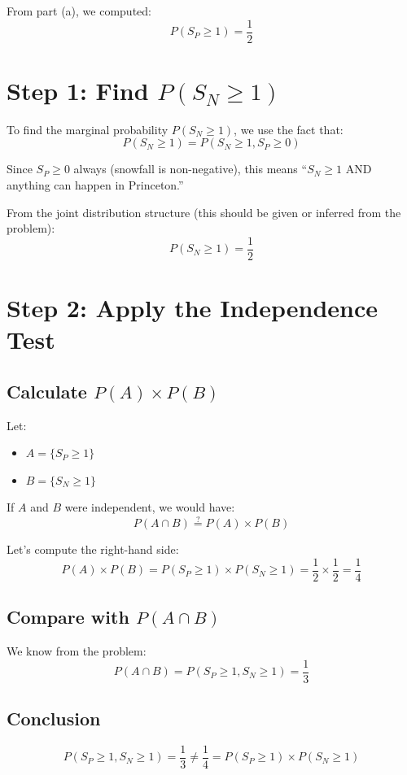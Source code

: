 \documentclass[11pt]{article}
\begin{document}
From part (a), we computed:
\[
P(S_P \geq 1) = \frac{1}{2}
\]

\section*{Step 1: Find $P(S_N \geq 1)$}

To find the marginal probability $P(S_N \geq 1)$, we use the fact that:
\[
P(S_N \geq 1) = P(S_N \geq 1, S_P \geq 0)
\]

Since $S_P \geq 0$ always (snowfall is non-negative), this means ``$S_N \geq 1$ AND anything can happen in Princeton.''

From the joint distribution structure (this should be given or inferred from the problem):
\[
P(S_N \geq 1) = \frac{1}{2}
\]

\section*{Step 2: Apply the Independence Test}

\subsection*{Calculate $P(A) \times P(B)$}

Let:
\begin{itemize}
    \item $A = \{S_P \geq 1\}$
    \item $B = \{S_N \geq 1\}$
\end{itemize}

If $A$ and $B$ were independent, we would have:
\[
P(A \cap B) \stackrel{?}{=} P(A) \times P(B)
\]

Let's compute the right-hand side:
\[
P(A) \times P(B) = P(S_P \geq 1) \times P(S_N \geq 1) = \frac{1}{2} \times \frac{1}{2} = \frac{1}{4}
\]

\subsection*{Compare with $P(A \cap B)$}

We know from the problem:
\[
P(A \cap B) = P(S_P \geq 1, S_N \geq 1) = \frac{1}{3}
\]

\subsection*{Conclusion}

\[
P(S_P \geq 1, S_N \geq 1) = \frac{1}{3} \neq \frac{1}{4} = P(S_P \geq 1) \times P(S_N \geq 1)
\]
\end{document}
